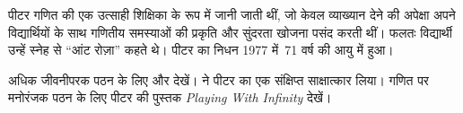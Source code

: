 \documentclass[../../../include/open-logic-section]{subfiles}
\begin{document}
पीटर गणित की एक उत्साही शिक्षिका के रूप में जानी जाती थीं, जो केवल व्याख्यान
देने की अपेक्षा अपने विद्यार्थियों के साथ गणितीय समस्याओं की प्रकृति और
सुंदरता खोजना पसंद करती थीं। फलतः विद्यार्थी उन्हें स्नेह से ``आंट रोज़ा''
कहते थे। पीटर का निधन 1977 में~71 वर्ष की आयु में हुआ।

\begin{reading}
अधिक जीवनीपरक पठन के लिए \citep{Oconnor2014} और \citep{Andrasfai1986}
देखें। \citet{Tamassy1994} ने पीटर का एक संक्षिप्त साक्षात्कार लिया। गणित पर
मनोरंजक पठन के लिए पीटर की पुस्तक \emph{Playing With Infinity}
\citep{Peter2010} देखें।
\end{reading}
\end{document}
